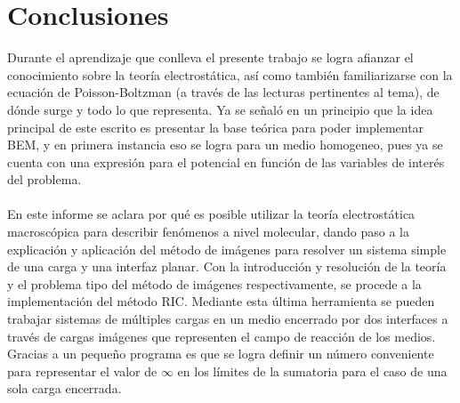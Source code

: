 \documentclass[12pt, oneside, numbers, spanish]{ezthesis}
\numberwithin{equation}{section}
\begin{document}





\chapter{Conclusiones}
Durante el aprendizaje que conlleva el presente trabajo se logra afianzar el conocimiento sobre la teoría electrostática, así como también familiarizarse con la ecuación de Poisson-Boltzman (a través de las lecturas pertinentes al tema), de dónde surge y todo lo que representa. Ya se señaló en un principio que la idea principal de este escrito es presentar la base teórica para poder implementar BEM, y en primera instancia eso se logra para un medio homogeneo, pues ya se cuenta con una expresión para el potencial en función de las variables de interés del problema.\\\\
En este informe se aclara por qué es posible utilizar la teoría electrostática macroscópica para describir fenómenos a nivel molecular, dando paso a la explicación y aplicación del método de imágenes para resolver un sistema simple de una carga y una interfaz planar. Con la introducción y resolución de la teoría y el problema tipo del método de imágenes respectivamente, se procede a la implementación del método RIC. Mediante esta última herramienta se pueden trabajar sistemas de múltiples cargas en un medio encerrado por dos interfaces a través de cargas imágenes que representen el campo de reacción de los medios. Gracias a un pequeño programa es que se logra definir un número conveniente para representar el valor de $\infty$ en los límites de la sumatoria para el caso de una sola carga encerrada.
\end{document}
